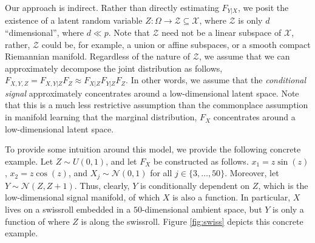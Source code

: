 \documentclass{article} %
\providecommand{\mc}[1]{\mathcal{#1}}
\newcommand{\from}{{\ensuremath{\colon}}}  %
\begin{document}
Our approach is indirect.  Rather than directly estimating $F_{Y|X}$, we posit the existence of 
a latent random variable $Z \from \Omega \to \mc{Z} \subseteq \mc{X}$, where $\mc{Z}$ is only $d$ ``dimensional'', where $d \ll p$.   
Note that $\mc{Z}$ need not be a linear subspace of $\mc{X}$, rather, $\mc{Z}$ could be, for example,  a union or affine subspaces, or a smooth compact Riemannian manifold.  Regardless of the nature of $\mc{Z}$, we assume that we can approximately decompose the joint distribution as follows,  $F_{X,Y,Z}=F_{X,Y|Z}F_Z \approx F_{X|Z} F_{Y|Z} F_Z$.  In other words, we assume that the \emph{conditional signal} approximately concentrates around a low-dimensional latent space.  Note that this is a much less restrictive assumption than the commonplace assumption in manifold learning that the marginal distribution, $F_X$ concentrates around a low-dimensional latent space.  



To provide some intuition around this model, we provide the following concrete example.
Let $Z \sim U(0,1)$, and let $F_X$ be constructed as follows. $x_1=z \sin (z)$, $x_2=z \cos (z)$, and $X_j \sim \mc{N}(0,1)$ for all $j \in \{3, \ldots, 50\}$.  Moreover, let $Y \sim \mc{N}(Z,Z+1)$.  Thus, clearly, $Y$ is conditionally dependent on $Z$, which is the low-dimensional signal manifold, of which $X$ is also a function.  In particular, $X$ lives on a swissroll embedded in a $50$-dimensional ambient space, but $Y$ is only a function of where $Z$ is along the swissroll. Figure \ref{fig:swiss} depicts this concrete example.
\end{document}
